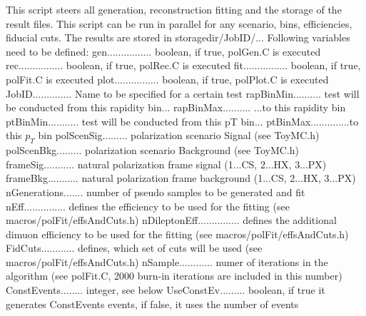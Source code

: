 \documentclass{article}
\begin{document}
This script steers all generation, reconstruction fitting and the storage of the result
files. This script can be run in parallel for any scenario, bins, efficiencies, fiducial
cuts. The results are stored in storagedir/JobID/...
Following variables need to be defined:
\newline gen................ boolean, if true, polGen.C is executed
\newline rec................ boolean, if true, polRec.C is executed
\newline fit................ boolean, if true, polFit.C is executed
\newline plot................ boolean, if true, polPlot.C is executed
\newline JobID.............. Name to be specified for a certain test
\newline rapBinMin.......... test will be conducted from this rapidity bin...
\newline rapBinMax.......... ...to this rapidity bin
\newline ptBinMin........... test will be conducted from this pT bin...
\newline ptBinMax..............to this $p_T$ bin
\newline polScenSig......... polarization scenario Signal (see ToyMC.h)
\newline polScenBkg......... polarization scenario Background (see ToyMC.h)
\newline frameSig........... natural polarization frame signal (1...CS, 2...HX, 3...PX)
\newline frameBkg........... natural polarization frame background (1...CS, 2...HX, 3...PX)
\newline nGenerations....... number of pseudo samples to be generated and fit
\newline nEff............... defines the efficiency to be used for the
fitting (see macros/polFit/effsAndCuts.h)
\newline nDileptonEff............... defines the additional dimuon efficiency to be used for the
fitting (see macros/polFit/effsAndCuts.h)
\newline FidCuts............ defines,
which set of cuts will be used (see macros/polFit/effsAndCuts.h)
\newline nSample............ numer of iterations in the algorithm (see polFit.C, 2000 burn-in iterations are included in this number)
\newline ConstEvents........ integer, see below
\newline UseConstEv......... boolean, if true it generates ConstEvents events, if false, it uses the number of events
\end{document}
